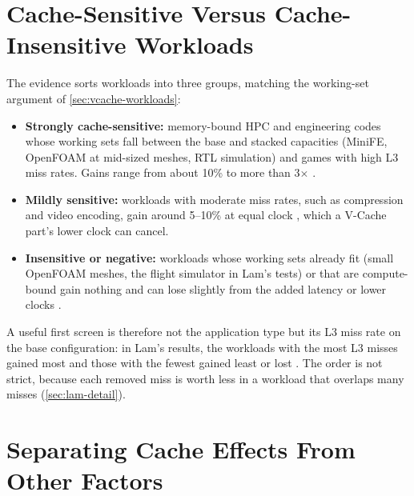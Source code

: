 \section{Cache-Sensitive Versus Cache-Insensitive Workloads}
\label{sec:workload-sensitivity}
The evidence sorts workloads into three groups, matching the working-set argument of \cref{sec:vcache-workloads}:
\begin{itemize}
  \item \textbf{Strongly cache-sensitive:} memory-bound HPC and engineering codes whose working sets fall between the base and stacked capacities (MiniFE, OpenFOAM at mid-sized meshes, RTL simulation) and games with high L3 miss rates. Gains range from about 10\% to more than 3$\times$ \cite{domkeLocusPerformanceQuantifying2023,lawendaEvaluatingImpactL32025,lamAMDs7950X3DZen2023}.
  \item \textbf{Mildly sensitive:} workloads with moderate miss rates, such as compression and video encoding, gain around 5--10\% at equal clock \cite{lamAMDs7950X3DZen2023,cozmaDeepDivingZen2022}, which a V-Cache part's lower clock can cancel.
  \item \textbf{Insensitive or negative:} workloads whose working sets already fit (small OpenFOAM meshes, the flight simulator in Lam's tests) or that are compute-bound gain nothing and can lose slightly from the added latency or lower clocks \cite{lawendaEvaluatingImpactL32025,lamAMDs7950X3DZen2023,larabelAMDRyzen72022}.
\end{itemize}
A useful first screen is therefore not the application type but its L3 miss rate on the base configuration: in Lam's results, the workloads with the most L3 misses gained most and those with the fewest gained least or lost \cite{lamAMDs7950X3DZen2023}. The order is not strict, because each removed miss is worth less in a workload that overlaps many misses (\cref{sec:lam-detail}).

\section{Separating Cache Effects From Other Factors}
\label{sec:confounds}

